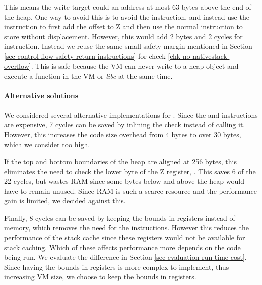 This means the write target could an address at most 63 bytes above the end of the heap. One way to avoid this is to avoid the  instruction, and instead use the  instruction to first add the offset to Z and then use the normal  instruction to store without displacement. However, this would add 2 bytes and 2 cycles for instruction. Instead we reuse the same small safety margin mentioned in Section \ref{sec-control-flow-safety-return-instructions} for check \ref{chk-no-nativestack-overflow}. This is safe because the VM can never write to a heap object and execute a function in the VM or \emph{libc} at the same time.

\paragraph{Alternative solutions}
We considered several alternative implementations for . Since the  and  instructions are expensive, 7 cycles can be saved by inlining the check instead of calling it. However, this increases the code size overhead from 4 bytes to over 30 bytes, which we consider too high.

If the top and bottom boundaries of the heap are aligned at 256 bytes, this eliminates the need to check the lower byte of the Z register, . This saves 6 of the 22 cycles, but wastes RAM since some bytes below and above the heap would have to remain unused. Since RAM is such a scarce resource and the performance gain is limited, we decided against this.

Finally, 8 cycles can be saved by keeping the bounds in registers instead of memory, which removes the need for the  instructions. However this reduces the performance of the stack cache since these registers would not be available for stack caching. Which of these affects performance more depends on the code being run. We evaluate the difference in Section \ref{sec-evaluation-run-time-cost}. Since having the bounds in registers is more complex to implement, thus increasing VM size, we choose to keep the bounds in registers.


